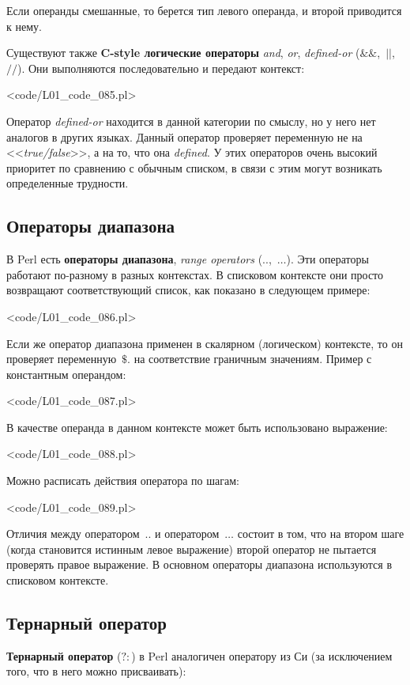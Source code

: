 Если операнды смешанные, то берется тип левого операнда, и второй приводится к нему.

Существуют также \textbf{C-style логические операторы} \textit{and}, \textit{or}, \textit{defined-or} ($\&\&$,~$||$,~$//$).
Они выполняются последовательно и передают контекст:

\pr<code/L01_code_085.pl>

Оператор \textit{defined-or} находится в данной категории по смыслу, но у него нет аналогов в других языках.
Данный оператор проверяет переменную не на <<\textit{true/false}>>, а на то, что она \textit{defined}.
У этих операторов очень высокий приоритет по сравнению с обычным списком, в связи с этим могут возникать определенные трудности.

\subsection{Операторы диапазона}
В Perl есть \textbf{операторы диапазона}, \textit{range operators} ($..$,~$\dots$).
Эти операторы работают по-разному в разных контекстах.
В списковом контексте они просто возвращают соответствующий список, как показано в следующем примере:

\pr<code/L01_code_086.pl>


Если же оператор диапазона применен в скалярном (логическом) контексте, то он проверяет переменную~$\$.$ на соответствие граничным значениям.
Пример с константным операндом:

\pr<code/L01_code_087.pl>


В качестве операнда в данном контексте может быть использовано выражение:

\pr<code/L01_code_088.pl>

Можно расписать действия оператора по шагам:

\pr<code/L01_code_089.pl>

Отличия между оператором~$..$ и оператором~$\dots$ состоит в том, что на втором шаге (когда становится истинным левое выражение) второй оператор не пытается проверять правое выражение.
В основном операторы диапазона используются в списковом контексте.

\subsection{Тернарный оператор}
\textbf{Тернарный оператор} ($?:$) в Perl аналогичен оператору из Си (за исключением того, что в него можно присваивать):

